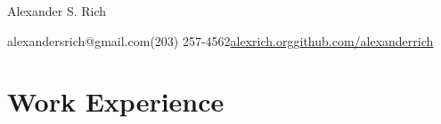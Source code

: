\documentclass[10pt]{resume}
\begin{document}
{\Large Alexander S. Rich}
\begin{addmargin}[1em]{0em}
alexandersrich@gmail.com\hspace{1em}\textbar\hspace{1em}(203)
257-4562\hspace{1em}\textbar\hspace{1em}\href{http://www.alexrich.org}{alexrich.org}\hspace{1em}\textbar\hspace{1em}\href{http://www.github.com/alexanderrich}{github.com/alexanderrich}
\end{addmargin}


\section{Work Experience}

\hrulefill
\end{document}
